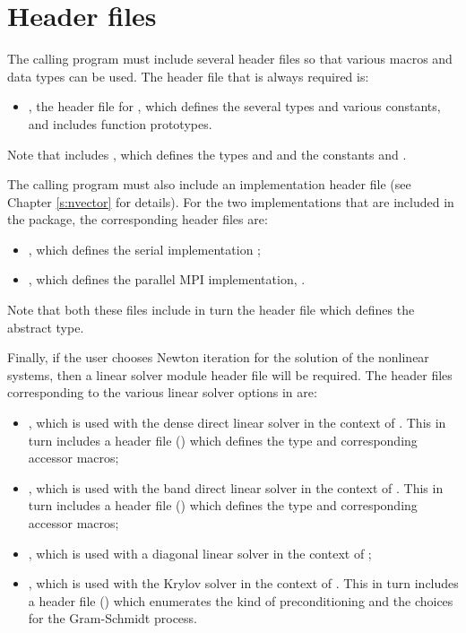 \section{Header files}\label{ss:header_sim}
The calling program must include several header files so that various macros
and data types can be used. The header file that is always required is:
\begin{itemize}
\item  {}, 
  the header file for {\cvode}, which defines the several
  types and various constants, and includes function prototypes.
\end{itemize}
Note that  includes , 
which defines the types  and 
and the constants  and .

The calling program must also include an {\nvector} implementation header file
(see Chapter \ref{s:nvector} for details).
For the two {\nvector} implementations that are included in the {\cvode} package,
the corresponding header files are:
\begin{itemize}
\item {}, 
  which defines the serial implementation {\nvecs};
\item {}, 
  which defines the parallel MPI implementation, {\nvecp}.
\end{itemize}
Note that both these files include in turn the header file  which 
defines the abstract  type. 

Finally, if the user chooses Newton iteration for the solution of the nonlinear
systems, then a linear solver module header file will be required. 
The header files corresponding to the various linear solver options in
{\cvode} are:
\begin{itemize}
\item {}, 
  which is used with the dense direct linear solver in 
  the context of {\cvode}. This in turn includes a header file ()
  which defines the  type and corresponding accessor macros; 
\item {}, 
  which is used with the band direct linear solver in the
  context of {\cvode}. This in turn includes a header file ()
  which defines the  type and corresponding accessor macros;
\item {}, which is used with a diagonal linear solver in the
  context of {\cvode};
\item {}, 
  which is used with the Krylov solver {\spgmr} in the
  context of {\cvode}. This in turn includes a header file ()
  which enumerates the kind of preconditioning and the choices for the
  Gram-Schmidt process.
\end{itemize}


